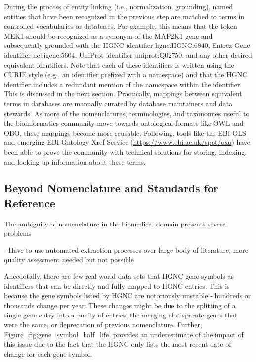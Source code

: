 During the process of entity linking (i.e., normalization, grounding), named entities that have been recognized in the previous step are matched to terms in controlled vocabularies or databases.
For example, this means that the token MEK1 should be recognized as a synonym of the MAP2K1 gene and subsequently grounded with the \ac{HGNC} identifier hgnc:HGNC:6840, Entrez Gene identifier ncbigene:5604, UniProt identifier uniprot:Q02750, and any other desired equivalent identifiers.
Note that each of these identifiers is written using the \ac{CURIE} style (e.g., an identifier prefixed with a namespace) and that the \ac{HGNC} identifier includes a redundant mention of the namespace within the identifier.
This is discussed in the next section.
Practically, mappings between equivalent terms in databases are manually curated by database maintainers and data stewards.
As more of the nomenclatures, terminologies, and taxonomies useful to the bioinformatics community move towards ontological formats like OWL and OBO, these mappings become more reusable.
Following, tools like the \ac{EBI} \ac{OLS}~\cite{Cote2006} and emerging \ac{EBI} Ontology Xref Service (\url{https://www.ebi.ac.uk/spot/oxo}) have been able to prove the community with technical solutions for storing, indexing, and looking up information about these terms.

\subsection{Beyond Nomenclature and Standards for Reference}

The ambiguity of nomenclature in the biomedical domain presents several problems

- Have to use automated extraction processes over large body of literature, more quality assessment needed but not possible

Anecdotally, there are few real-world data sets that \ac{HGNC} gene symbols as identifiers that can be directly and fully mapped to \ac{HGNC} entries.
This is because the gene symbols listed by \ac{HGNC} are notoriously unstable - hundreds or thousands change per year.
These changes might be due to the splitting of a single gene entry into a family of entries, the merging of disparate genes that were the same, or deprecation of previous nomenclature.
Further, Figure~\ref{fig:gene_symbol_half_life} provides an underestimate of the impact of this issue due to the fact that the \ac{HGNC} only lists the most recent date of change for each gene symbol.

